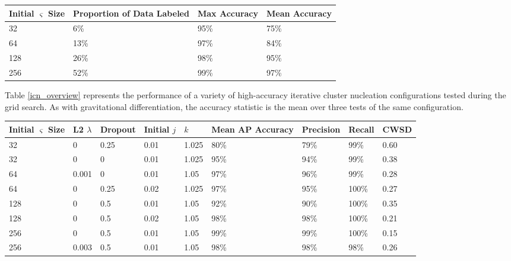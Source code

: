 \documentclass[10pt]{article}
\begin{document}
\begin{minipage}{\textwidth}
    \begin{center}
         \label{icn_accuracy_by_varsigma}
        \begin{tabular}{|l|l|l|l|}
            \hline
            Initial $\varsigma$ Size & Proportion of Data Labeled & Max Accuracy & Mean Accuracy \\
            \hline
            32 & 6\% & 95\% & 75\% \\
            \hline
            64 & 13\% & 97\% & 84\% \\
            \hline
            128 & 26\% & 98\% & 95\% \\
            \hline
            256 & 52\% & 99\% & 97\% \\
            \hline
        \end{tabular}
    \end{center}
\end{minipage}

Table \ref{icn_overview} represents the performance of a variety of high-accuracy iterative cluster nucleation configurations tested during the grid search. As with gravitational differentiation, the accuracy statistic is the mean over three tests of the same configuration.

\begin{minipage}{\textwidth}
    \begin{center}
         \label{icn_overview}
        \begin{tabular}{|l|l|l|l|l|l|l|l|l|}
            \hline
            Initial $\varsigma$ Size & L2 $\lambda$ & Dropout & Initial $j$ & $k$ & Mean AP Accuracy & Precision & Recall & CWSD \\
            \hline
            32 & 0 & 0.25 & 0.01 & 1.025 & 80\% & 79\% & 99\% & 0.60 \\
            \hline
            32 & 0 & 0 & 0.01 & 1.025 & 95\% & 94\% & 99\% & 0.38 \\
            \hline
            64 & 0.001 & 0 & 0.01 & 1.05 & 97\% & 96\% & 99\% & 0.28 \\
            \hline
            64 & 0 & 0.25 & 0.02 & 1.025 & 97\% & 95\% & 100\% & 0.27 \\
            \hline
            128 & 0 & 0.5 & 0.01 & 1.05 & 92\% & 90\% & 100\% & 0.35 \\
            \hline
            128 & 0 & 0.5 & 0.02 & 1.05 & 98\% & 98\% & 100\% & 0.21 \\
            \hline
            256 & 0 & 0.5 & 0.01 & 1.05 & 99\% & 99\% & 100\% & 0.15 \\
            \hline
            256 & 0.003 & 0.5 & 0.01 & 1.05 & 98\% & 98\% & 98\% & 0.26 \\
            \hline
        \end{tabular}
    \end{center}
\end{minipage}
\end{document}

